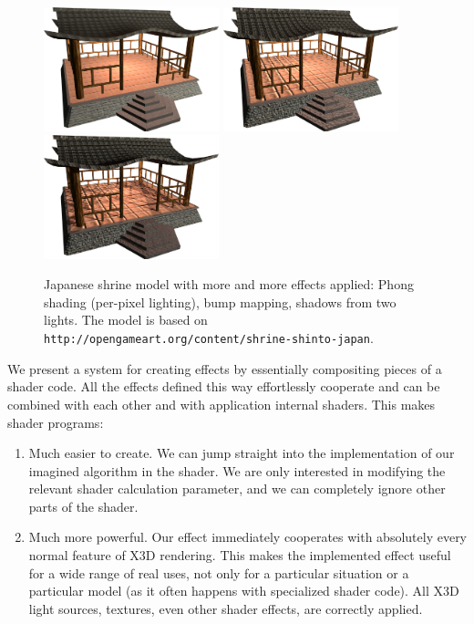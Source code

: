 \documentclass{egpubl}
\begin{document}
\begin{figure}[t]
  \centering
  \includegraphics[width=2.0in]{rhan_shrine_1_per_pixel_lighting}
  \includegraphics[width=2.0in]{rhan_shrine_2_bump_mapping}
  \includegraphics[width=2.0in]{rhan_shrine_5_everything}
  \caption{Japanese shrine model with more and more effects applied:
Phong shading (per-pixel lighting), bump mapping, shadows from two lights.
The model is based on \texttt{http://opengameart.org/content/shrine-shinto-japan}.}
  \label{fig_bump_mapping_shadows}
\end{figure}

We present a system for creating effects by essentially compositing
pieces of a shader code. All the effects defined this way effortlessly
cooperate and can be combined with each other and with application internal
shaders. This makes shader programs:

\begin{enumerate}
\item Much easier to create. We can jump straight into the implementation
  of our imagined algorithm in the shader.
  We are only interested in modifying the relevant shader calculation
  parameter, and we can completely ignore other parts of the shader.

\item Much more powerful. Our effect
  immediately cooperates with absolutely every normal feature of X3D rendering.
  This makes the implemented effect useful for a wide range of real uses,
  not only for a particular situation or a particular model (as it often happens
  with specialized shader code).
  All X3D light sources, textures, even other shader effects,
  are correctly applied.
\end{enumerate}
\end{document}

